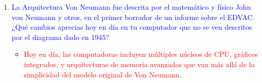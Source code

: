 \documentclass{article}
\begin{document}
\begin{enumerate}
    \item \textcolor{blue}{La Arquitectura Von Neumann fue descrita por el matemático y físico John von Neumann y otros, en el primer borrador de un informe sobre el EDVAC. ¿Qué cambios aprecias hoy en día en tu computador que no se ven descritos por el diagrama dado en 1945?}
    \begin{itemize}
        \item \textcolor{red}{Hoy en día, las computadoras incluyen múltiples núcleos de CPU, gráficos integrados, y arquitecturas de memoria avanzadas que van más allá de la simplicidad del modelo original de Von Neumann.}
    \end{itemize}
\end{enumerate}
\end{document}
